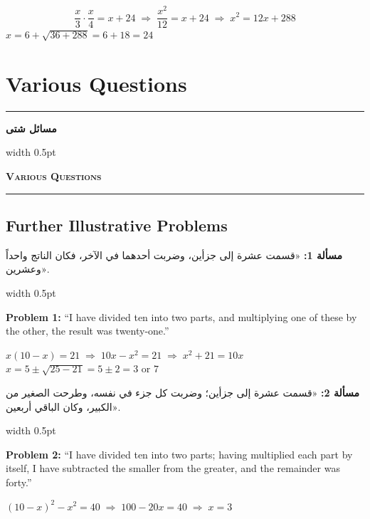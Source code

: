 \documentclass[10pt,a4paper]{book}
\newlength{\colwidth}
\newcommand{\bilingualpair}[2]{%
  \noindent
  \begin{minipage}[t]{\colwidth}
  \begin{flushright}
  \vspace{0pt}
  {\arabicfont\small #1}
  \end{flushright}
  \end{minipage}%
  \hfill\textcolor{columnsepclr}{\vrule width 0.5pt}\hfill
  \begin{minipage}[t]{\colwidth}
  \vspace{0pt}
  {\small #2}
  \end{minipage}%
  \par\vspace{0.6em}
}
\newcommand{\bilingualsectionheader}[2]{%
  \par\vspace{0.8em}
  \noindent
  \begin{minipage}[t]{\colwidth}
  \begin{flushright}
  \textbf{\arabicfont #1}
  \end{flushright}
  \end{minipage}%
  \hfill\textcolor{columnsepclr}{\vrule width 0.5pt}\hfill
  \begin{minipage}[t]{\colwidth}
  \textbf{\textsc{#2}}
  \end{minipage}%
  \par\vspace{0.5em}
}
\begin{document}
\begin{mathbox}
\begin{equation}
\frac{x}{3} \cdot \frac{x}{4} = x + 24 \;\Rightarrow\; \frac{x^2}{12} = x + 24
\;\Rightarrow\; x^2 = 12x + 288
\end{equation}
$x = 6 + \sqrt{36 + 288} = 6 + 18 = 24$
\end{mathbox}

\newpage

\chapter{Various Questions}
\label{ch:various}

\noindent\textcolor{columnsepclr}{\rule{\textwidth}{0.6pt}}\par\vspace{0.3em}
\bilingualsectionheader{مسائل شتى}{Various Questions}
\noindent\textcolor{columnsepclr}{\rule{\textwidth}{0.6pt}}\par\vspace{0.5em}

\section*{Further Illustrative Problems}

\bilingualpair{
\textbf{مسألة 1:} «قسمت عشرة إلى جزأين، وضربت أحدهما في
الآخر، فكان الناتج واحداً وعشرين».
}{
\textbf{Problem 1:} ``I have divided ten into two parts, and multiplying one
of these by the other, the result was twenty-one.''
}

\begin{mathbox}
$x(10-x) = 21 \;\Rightarrow\; 10x - x^2 = 21 \;\Rightarrow\; x^2 + 21 = 10x$
$x = 5 \pm \sqrt{25 - 21} = 5 \pm 2 = 3 \text{ or } 7$
\end{mathbox}

\bilingualpair{
\textbf{مسألة 2:} «قسمت عشرة إلى جزأين؛ وضربت كل جزء في
نفسه، وطرحت الصغير من الكبير، وكان الباقي أربعين».
}{
\textbf{Problem 2:} ``I have divided ten into two parts; having multiplied
each part by itself, I have subtracted the smaller from the greater, and the
remainder was forty.''
}

\begin{mathbox}
$(10-x)^2 - x^2 = 40 \;\Rightarrow\; 100 - 20x = 40 \;\Rightarrow\; x = 3$
\end{mathbox}
\end{document}
